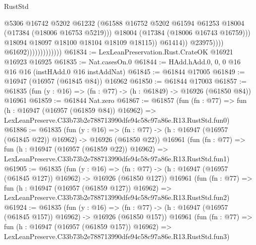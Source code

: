 \begin{lexlean}{RustStd}
\begin{coremodule}
                                                @5306
                                                @16742
                                                @5202
                                                @61232
                                                (@61588
                                                  @16752
                                                  @5202
                                                  @61594
                                                  @61253
                                                  @18004
                                                  (@17384 (@18006 @16753 @5219)))
                                                @18004
                                                (@17384 (@18006 @16743 @16759)))
                                              @18094
                                              @18097
                                              @18100
                                              @18104
                                              @18109
                                              @18115))
                                          @61414))
                                      @23975))))
                              @61692)))))))))))))
@61834 := LexLeanPreservation.Rust.CrateOK @16921 @16923 @16925
@61835 := Nat.casesOn.{0}
@61844 := HAdd.hAdd.{0, 0, 0} @16 @16 @16 (instHAdd.{0} @16 instAddNat)
@61845 := @61844 @17005
@61849 := @16947 (@16957 (@61845 @84)) @16962
@61850 := @61844 @17003
@61857 := @61835 (fun (y : @16) => (fn : @77) -> (h : @61849) -> @16926 (@61850 @84)) @16961
@61859 := @61844 Nat.zero
@61867 := @61857
    (fun (fn : @77) =>
    fun (h : @16947 (@16957 (@61859 @84)) @16962) =>
    LexLeanPreserve.C33b73b2e788713990dfe94c58c97a86e.R13.RustStd.fun0)
@61886 := @61835
    (fun (y : @16) =>
    (fn : @77) -> (h : @16947 (@16957 (@61845 @22)) @16962) -> @16926 (@61850 @22))
    @16961
    (fun (fn : @77) =>
    fun (h : @16947 (@16957 (@61859 @22)) @16962) =>
    LexLeanPreserve.C33b73b2e788713990dfe94c58c97a86e.R13.RustStd.fun1)
@61905 := @61835
    (fun (y : @16) =>
    (fn : @77) -> (h : @16947 (@16957 (@61845 @127)) @16962) -> @16926 (@61850 @127))
    @16961
    (fun (fn : @77) =>
    fun (h : @16947 (@16957 (@61859 @127)) @16962) =>
    LexLeanPreserve.C33b73b2e788713990dfe94c58c97a86e.R13.RustStd.fun2)
@61924 := @61835
    (fun (y : @16) =>
    (fn : @77) -> (h : @16947 (@16957 (@61845 @157)) @16962) -> @16926 (@61850 @157))
    @16961
    (fun (fn : @77) =>
    fun (h : @16947 (@16957 (@61859 @157)) @16962) =>
    LexLeanPreserve.C33b73b2e788713990dfe94c58c97a86e.R13.RustStd.fun3)

\end{coremodule}
\end{lexlean}
